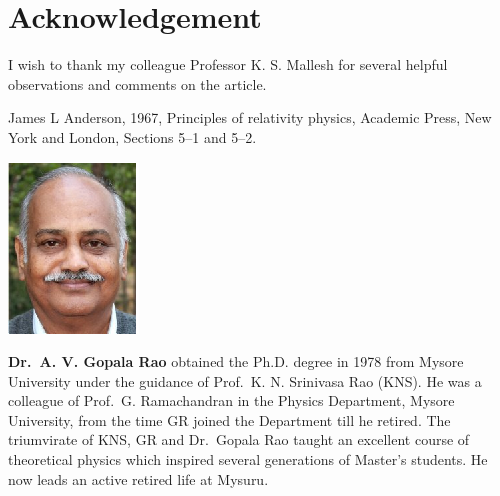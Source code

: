 \section*{Acknowledgement} 

I wish to thank my colleague Professor K. S. Mallesh for several helpful observations and comments on the article.

\renewcommand{\bibname}{Reference}
\begin{thebibliography}{99}
 James L Anderson, 1967, Principles of relativity physics, Academic Press, New York and London, Sections 5--1 and 5--2.
\end{thebibliography}
\vskip 1cm

\centerline{\includegraphics[scale=2]{authorsphotos/Prof_A_V_Gopala_Rao.eps}}
\bigskip

\noindent
\textbf{Dr.\ A. V. Gopala Rao} obtained the Ph.D. degree in 1978 from Mysore University under the guidance of Prof.\ K. N. Srinivasa Rao (KNS). He was a colleague of Prof.\ G. Ramachandran in the Physics Department, Mysore University, from the time GR joined the Department till he retired. The triumvirate of KNS, GR and Dr.\ Gopala Rao taught an excellent course of theoretical physics which inspired several generations of Master’s students. He now leads an active retired life at Mysuru.
